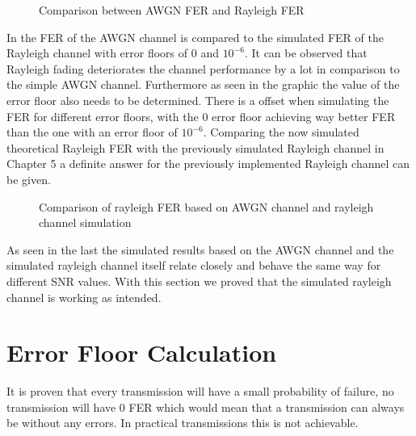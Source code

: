 \begin{figure}[!h]
	\setlength{}
	\setlength\fheight{0.4\textheight}
	\centering
	
	\caption{Comparison between AWGN FER and Rayleigh FER}
	\label{fig:FERAWGNRAY}
\end{figure}
\newpage
In  the \gls{FER} of the AWGN channel is compared to the simulated \gls{FER} of the Rayleigh channel with error floors of $0$ and $10^{-6}$. It can be observed that Rayleigh fading deteriorates the channel performance by a lot in comparison to the simple AWGN channel. Furthermore as seen in the graphic the value of the error floor also needs to be determined. There is a offset when simulating the \gls{FER} for different error floors, with the 0 error floor achieving way better \gls{FER} than the one with an error floor of $10^{-6}$. Comparing the now simulated theoretical Rayleigh \gls{FER} with the previously simulated Rayleigh channel in Chapter 5 a definite answer for the previously implemented Rayleigh channel can be given.
\newpage
\begin{figure}[!htb]
	\setlength{}
	\setlength\fheight{0.4\textheight}
	\centering
	
	\caption{Comparison of rayleigh FER based on AWGN channel and rayleigh channel simulation}
	\label{fig:AWGNRAYCOMP}
\end{figure}
As seen in the last  the simulated results based on the AWGN channel and the simulated rayleigh channel itself relate closely and behave the same way for different \gls{SNR} values. With this section we proved that the simulated rayleigh channel is working as intended. 

\clearpage

\section{Error Floor Calculation}
\label{sec:ErrorFloor}

 It is proven that every transmission will have a small probability of failure, no transmission will have 0 \gls{FER} which would mean that a transmission can always be without any errors. In practical transmissions this is not achievable.


